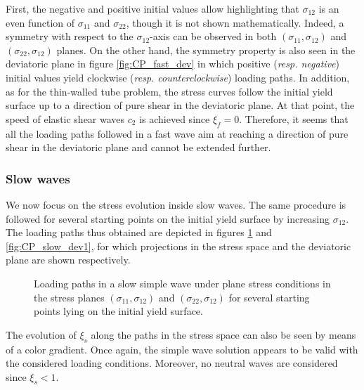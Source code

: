 First, the negative and positive initial values allow highlighting that $\sigma_{12}$ is an even function of $\sigma_{11}$ and $\sigma_{22}$, though it is not shown mathematically.
Indeed, a symmetry with respect to the $\sigma_{12}$-axis can be observed in both $(\sigma_{11},\sigma_{12})$ and $(\sigma_{22},\sigma_{12})$ planes.
On the other hand, the symmetry property is also seen in the deviatoric plane in figure \ref{fig:CP_fast_dev} in which positive (\textit{resp. negative}) initial values yield clockwise (\textit{resp. counterclockwise}) loading paths.
In addition, as for the thin-walled tube problem, the stress curves follow the initial yield surface up to a direction of pure shear in the deviatoric plane.
At that point, the speed of elastic shear waves $c_2$ is achieved since $\xi_f=0$.
Therefore, it seems that all the loading paths followed in a fast wave aim at reaching a direction of pure shear in the deviatoric plane and cannot be extended further.



\subsubsection{Slow waves}
We now focus on the stress evolution inside slow waves.
The same procedure is followed for several starting points on the initial yield surface by increasing $\sigma_{12}$.
The loading paths thus obtained are depicted in figures \ref{fig:CP_slow_stress1} and \ref{fig:CP_slow_dev1}, for which projections in the stress space and the deviatoric plane are shown respectively.
\begin{figure}[h!]
  \centering
  { \label{subfig:CP_slow_stress11} }
  { \label{subfig:CP_slow_stress12} }
  
  \caption{Loading paths in a slow simple wave under plane stress conditions in the stress planes $(\sigma_{11},\sigma_{12})$ and $(\sigma_{22},\sigma_{12})$ for several starting points lying on the initial yield surface.}
  \label{fig:CP_slow_stress1}
\end{figure}
The evolution of $\xi_s$ along the paths in the stress space can also be seen by means of a color gradient.
Once again, the simple wave solution appears to be valid with the considered loading conditions.
Moreover, no neutral waves are considered since $\xi_s<1$.


